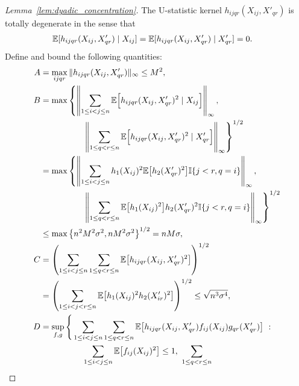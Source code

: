 \begin{proof}[Lemma~\ref{lem:dyadic_concentration}]
  The U-statistic kernel $h_{i j q r}(X_{i j}, X'_{qr})$
  is totally degenerate in the sense that
  \begin{align*}
    \mathbb{E}[h_{i j q r}(X_{i j}, X'_{qr}) \mid X_{i j}]
    &=
    \mathbb{E}[h_{i j q r}(X_{i j}, X'_{qr}) \mid X'_{qr}]
    = 0.
  \end{align*}
  Define and bound the following quantities:
  \begingroup
  \allowdisplaybreaks
  \begin{align*}
    A
    &=
    \max_{i j q r}
    \|h_{i j q r}(X_{i j}, X'_{qr})\|_\infty
    \leq M^2, \\
    B
    &=
    \max
    \left\{
      \left\|
      \sum_{1 \leq i < j \leq n}
      \E\Big[
        h_{i j q r}(X_{i j}, X'_{qr})^2
        \mid X_{i j}
      \Big]
      \right\|_\infty,
      \right. \\
      &\left.
      \qquad\qquad\quad
      \left\|
      \sum_{1 \leq q < r \leq n}
      \E\Big[
        h_{i j q r}(X_{i j}, X'_{qr})^2
        \mid X'_{qr}
      \Big]
      \right\|_\infty
    \right\}^{1/2} \\
    &=
    \max
    \left\{
      \left\|
      \sum_{1 \leq i < j \leq n}
      h_1(X_{i j})^2
      \E\big[
        h_2(X_{qr}')^2
      \big]
      \I\{j<r, q=i\}
      \right\|_\infty,
      \right. \\
      &\left.
      \qquad\qquad\quad
      \left\|
      \sum_{1 \leq q < r \leq n}
      \E\big[
        h_1(X_{i j})^2
      \big]
      h_2(X_{qr}')^2
      \I\{j<r, q=i\}
      \right\|_\infty
    \right\}^{1/2} \\
    &\leq
    \max
    \left\{
      n^2 M^2 \sigma^2,
      n M^2 \sigma^2
    \right\}^{1/2}
    =
    n M \sigma, \\
    C
    &=
    \left(
      \sum_{1 \leq i < j \leq n}
      \sum_{1 \leq q < r \leq n}
      \E\big[
        h_{i j q r}(X_{i j}, X'_{qr})^2
      \big]
    \right)^{1/2} \\
    &=
    \left(
      \sum_{1 \leq i < j < r \leq n}
      \E\big[
        h_1(X_{i j})^2
        h_2(X_{i r}')^2
      \big]
    \right)^{1/2}
    \leq
    \sqrt{n^3 \sigma^4}, \\
    D
    &=
    \sup_{f,g} \Bigg\{
      \sum_{1 \leq i < j \leq n}
      \sum_{1 \leq q < r \leq n}
      \E\big[
        h_{i j q r}(X_{i j}, X'_{qr})
        f_{i j}(X_{i j})
        g_{qr}(X'_{qr})
      \big]
      \ : \\
      &\qquad\qquad\quad
      \sum_{1 \leq i < j \leq n}
      \E\big[f_{i j}(X_{i j})^2\big]
      \leq 1, \
      \sum_{1 \leq q < r \leq n}

\end{align*}
\end{proof}
